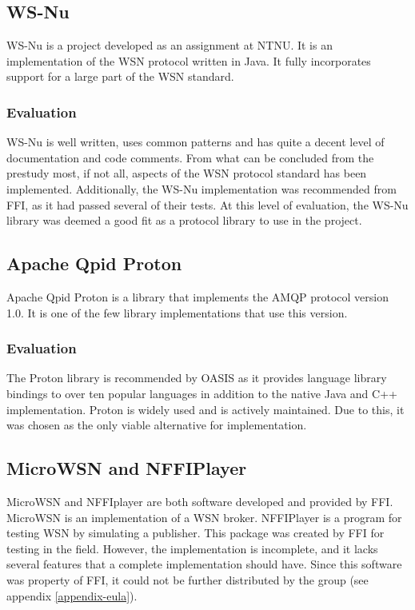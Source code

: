 \subsection{WS-Nu}
\label{subsec:prestudies-existing_solutions-ws_nu}

WS-Nu \cite{ws-nu} is a project developed as an assignment at NTNU. It is an implementation of the WSN protocol written in Java. It fully incorporates support for a large part of the WSN standard.

\subsubsection{Evaluation}
\label{subsec:prestudies-existing_solution-ws_nu-evaluation}

WS-Nu is well written, uses common patterns and has quite a decent level of documentation and code comments. From what can be concluded from the prestudy most, if not all, aspects of the WSN protocol standard has been implemented. Additionally, the WS-Nu implementation was recommended from FFI, as it had passed several of their tests. At this level of evaluation, the WS-Nu library was deemed a good fit as a protocol library to use in the project.

\subsection{Apache Qpid Proton}
\label{subsub-apache_qpid_proton}
Apache Qpid Proton \cite{amqp-qpid-proton} is a library that implements the AMQP protocol version 1.0. It is one of the few library implementations that use this version.

\subsubsection{Evaluation}
The Proton library is recommended by OASIS as it provides language library bindings to over ten popular languages in addition to the native Java and C++ implementation. Proton is widely used and is actively maintained. Due to this, it was chosen as the only viable alternative for implementation.

\subsection{MicroWSN and NFFIPlayer}
\label{subsec:prestudies-existing_solutions-micro_wsn_and_nffiplayer}

MicroWSN and NFFIplayer are both software developed and provided by FFI. MicroWSN is an implementation of a WSN broker. NFFIPlayer is a program for testing WSN by simulating a publisher. This package was created by FFI for testing in the field. However, the implementation is incomplete, and it lacks several features that a complete implementation should have. Since this software was property of FFI, it could not be further distributed by the group (see appendix \ref{appendix-eula}).

